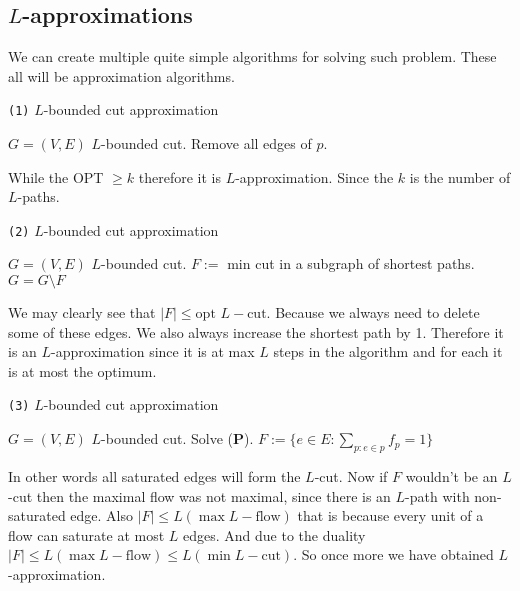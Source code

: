 \subsection{$L$-approximations}

We can create multiple quite simple algorithms for solving such problem. These all will be approximation algorithms.

\begin{algorithm}
	\caption{ \texttt{(1)} $L$-bounded cut approximation}
	\begin{algorithmic}[1]
		\Require $G = (V,E)$
		\Ensure $L$-bounded cut.
			\State Remove all edges of $p$.
		\EndWhile
	\end{algorithmic}
\end{algorithm}

\begin{observ}
	While the OPT $\geq k$ therefore it is $L$-approximation. Since the $k$ is the number of $L$-paths.
\end{observ}

\begin{algorithm}
	\caption{ \texttt{(2)} $L$-bounded cut approximation}
	\begin{algorithmic}[1]
		\Require $G = (V,E)$
		\Ensure $L$-bounded cut.
			\State $F := $ min cut in a subgraph of shortest paths.
			\State $G = G \setminus F$
		\EndWhile
	\end{algorithmic}
\end{algorithm}

We may clearly see that $|F| \leq \text{opt } L-\text{cut}$. Because we always need to delete some of these edges. We also always increase the shortest path by 1. Therefore it is an $L$-approximation since it is at max $L$ steps in the algorithm and for each it is at most the optimum.

\begin{algorithm}
	\caption{ \texttt{(3)} $L$-bounded cut approximation}
	\begin{algorithmic}[1]
		\Require $G = (V,E)$
		\Ensure $L$-bounded cut.
		\State Solve (\textbf{P}).
		\State $F := \{e \in E: \sum_{p : e \in p} f_p = 1\}$
	\end{algorithmic}
\end{algorithm}

In other words all saturated edges will form the $L$-cut. Now if $F$ wouldn't be an $L$-cut then the maximal flow was not maximal, since there is an $L$-path with non-saturated edge. Also $|F| \leq L (\max L-\text{flow})$ that is because every unit of a flow can saturate at most $L$ edges. And due to the duality $|F| \leq L (\max L-\text{flow}) \leq L (\min L-\text{cut})$. So once more we have obtained $L$-approximation.

